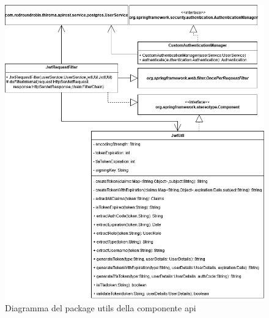 		
		\begin{figure}[H]
			\centering
			\includegraphics[scale=0.550]{res/images/API/UtilsPackage.png}
			\caption{Diagramma del package utils della componente api}
			\label{Diagramma 11}
		\end{figure}
